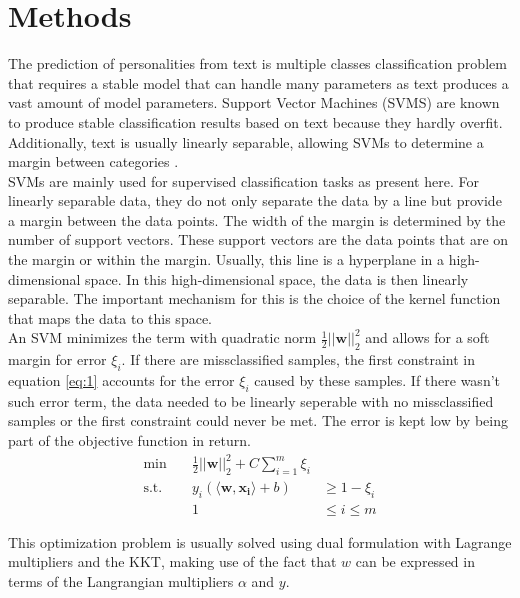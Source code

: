 \section{Methods}
\label{sec:methods}
The prediction of personalities from text is multiple classes classification problem that requires a stable model that can handle many parameters as text produces a vast amount of model parameters. Support Vector Machines (SVMS) are known to produce stable classification results based on text because they hardly overfit. Additionally, text is usually linearly separable, allowing SVMs to determine a margin between categories \cite{carbonell_text_1998}.\\
SVMs are mainly used for supervised classification tasks as present here. For linearly separable data, they do not only separate the data by a line but provide a margin between the data points. The width of the margin is determined by the number of support vectors. These support vectors are the data points that are on the margin or within the margin. Usually, this line is a hyperplane in a high-dimensional space. In this high-dimensional space, the data is then linearly separable. The important mechanism for this is the choice of the kernel function that maps the data to this space.\\
An SVM minimizes the term with quadratic norm ${\frac  {1}{2}}||{\mathbf  w}||_{2}^{2}$ and allows for a soft margin for error $\xi_i$. If there are missclassified samples, the first constraint in equation \ref{eq:1} accounts for the error $\xi_i$ caused by these samples. If there wasn't such error term, the data needed to be linearly seperable with no missclassified samples or the first constraint could never be met. The error is kept low by being part of the objective function in return.\\
\begin{equation}
\begin{array}{rrl}
    \text{min} \quad &{\frac  {1}{2}}||{\mathbf  w}||_{2}^{2}+C\sum _{{i=1}}^{m}\xi _{i} & \\[10pt]
    \text{s.t.} \quad & y_{i} (\langle \mathbf{w,x_{i}} \rangle +b) &\geq 1-\xi _{i}\\
    &1&\leq i \leq m 
\end{array}
\label{eq:1}
\end{equation}

This optimization problem is usually solved using dual formulation with Lagrange multipliers and the KKT, making use of the fact that $w$ can be expressed in terms of the Langrangian multipliers $\alpha$ and $y$.

